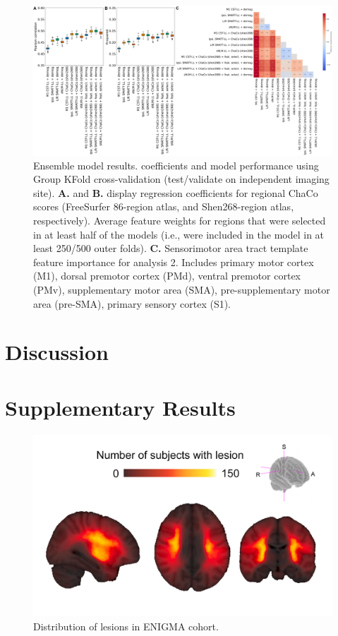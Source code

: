\documentclass[10pt]{article}
\newcommand{\beginsupplement}{%
\setcounter{table}{0}
\renewcommand{\thetable}{S\arabic{table}}%
\setcounter{figure}{0}
\renewcommand{\thefigure}{S\arabic{figure}}%
}
\begin{document}
\begin{figure}[htp]
\centering
\includegraphics[width=1\linewidth]{figures/Analysis2.png}
\caption{Ensemble model results. coefficients and model performance using Group KFold cross-validation (test/validate on independent imaging site). \textbf{A.} and \textbf{B.} display regression coefficients for regional ChaCo scores (FreeSurfer 86-region atlas, and Shen268-region atlas, respectively). Average feature weights for regions that were selected in at least half of the models (i.e., were included in the model in at least 250/500 outer folds). \textbf{C.} Sensorimotor area tract template feature importance for analysis 2. Includes primary motor cortex (M1), dorsal premotor cortex (PMd), ventral premotor cortex (PMv), supplementary motor area (SMA), pre-supplementary motor area (pre-SMA), primary sensory cortex (S1).}
\label{nemotool}
\end{figure}



\section{Discussion}

\clearpage



\printbibliography
\section*{Supplementary Results}

\beginsupplement
\begin{figure}[ht]
\centering
\includegraphics[width=0.8\linewidth]{figures/distribution_lesions.png}
\caption{Distribution of lesions in ENIGMA cohort.}
\label{lesiondist}
\end{figure}
\end{document}
